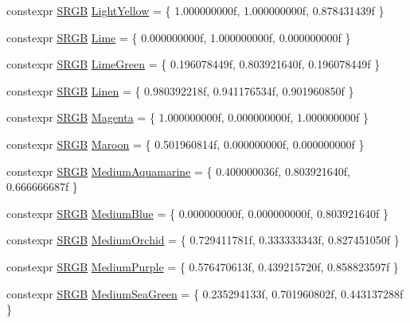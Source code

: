 \begin{DoxyCompactItemize}
\item 
constexpr \hyperlink{structmage_1_1_s_r_g_b}{S\+R\+GB} \hyperlink{namespacemage_1_1color_aee9bffbe060c632fbaa1f5d88724d9c3}{Light\+Yellow} = \{ 1.\+000000000f, 1.\+000000000f, 0.\+878431439f \}
\item 
constexpr \hyperlink{structmage_1_1_s_r_g_b}{S\+R\+GB} \hyperlink{namespacemage_1_1color_a1c999e1d7675cba74293d38a38139154}{Lime} = \{ 0.\+000000000f, 1.\+000000000f, 0.\+000000000f \}
\item 
constexpr \hyperlink{structmage_1_1_s_r_g_b}{S\+R\+GB} \hyperlink{namespacemage_1_1color_aad17b85a4829196c44f62040ff8f0b40}{Lime\+Green} = \{ 0.\+196078449f, 0.\+803921640f, 0.\+196078449f \}
\item 
constexpr \hyperlink{structmage_1_1_s_r_g_b}{S\+R\+GB} \hyperlink{namespacemage_1_1color_a3bc3cbcc39faeaafadff758fe12d817d}{Linen} = \{ 0.\+980392218f, 0.\+941176534f, 0.\+901960850f \}
\item 
constexpr \hyperlink{structmage_1_1_s_r_g_b}{S\+R\+GB} \hyperlink{namespacemage_1_1color_ae6528c5c8fa354b85b2e2a39b7e72d43}{Magenta} = \{ 1.\+000000000f, 0.\+000000000f, 1.\+000000000f \}
\item 
constexpr \hyperlink{structmage_1_1_s_r_g_b}{S\+R\+GB} \hyperlink{namespacemage_1_1color_a37a269928af33b477707f7002e3ce95e}{Maroon} = \{ 0.\+501960814f, 0.\+000000000f, 0.\+000000000f \}
\item 
constexpr \hyperlink{structmage_1_1_s_r_g_b}{S\+R\+GB} \hyperlink{namespacemage_1_1color_a9dc83bd80ac4c1b6af103ca821f86c41}{Medium\+Aquamarine} = \{ 0.\+400000036f, 0.\+803921640f, 0.\+666666687f \}
\item 
constexpr \hyperlink{structmage_1_1_s_r_g_b}{S\+R\+GB} \hyperlink{namespacemage_1_1color_a293a7031c9befc9ecc78a39c2590d4c0}{Medium\+Blue} = \{ 0.\+000000000f, 0.\+000000000f, 0.\+803921640f \}
\item 
constexpr \hyperlink{structmage_1_1_s_r_g_b}{S\+R\+GB} \hyperlink{namespacemage_1_1color_abd4a0da5e534777f98b837fa8e0ada94}{Medium\+Orchid} = \{ 0.\+729411781f, 0.\+333333343f, 0.\+827451050f \}
\item 
constexpr \hyperlink{structmage_1_1_s_r_g_b}{S\+R\+GB} \hyperlink{namespacemage_1_1color_a268bfcd5f8a8a72519e7bafe2a42d068}{Medium\+Purple} = \{ 0.\+576470613f, 0.\+439215720f, 0.\+858823597f \}
\item 
constexpr \hyperlink{structmage_1_1_s_r_g_b}{S\+R\+GB} \hyperlink{namespacemage_1_1color_a1d53cd3d2b17db6ffe78d7fea95d7f5d}{Medium\+Sea\+Green} = \{ 0.\+235294133f, 0.\+701960802f, 0.\+443137288f \}

\end{DoxyCompactItemize}
